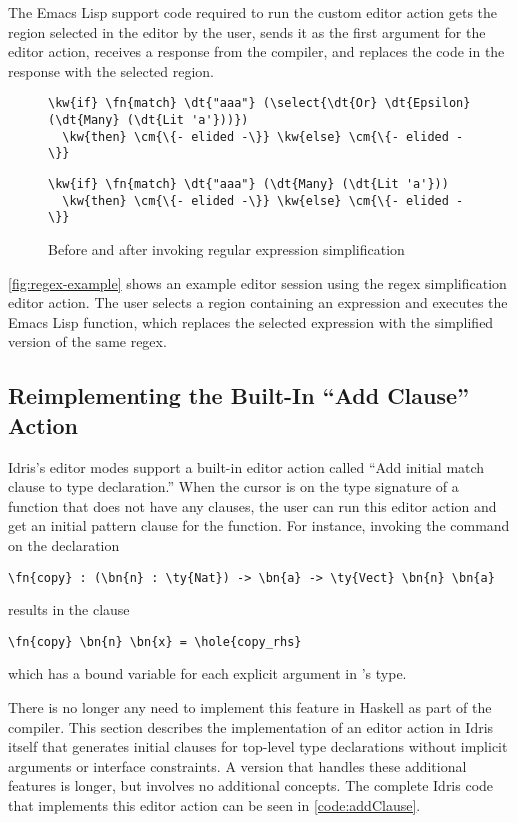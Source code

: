 The Emacs Lisp support code required to run the custom editor action gets the
region selected in the editor by the user, sends it as the first argument for
the  editor action, receives a response from the compiler,
and replaces the code in the response with the selected region.


\begin{figure}[ht]
\begin{Verbatim}
\kw{if} \fn{match} \dt{"aaa"} (\select{\dt{Or} \dt{Epsilon} (\dt{Many} (\dt{Lit 'a'}))})
  \kw{then} \cm{\{- elided -\}} \kw{else} \cm{\{- elided -\}}
\end{Verbatim}
  \vspace{1em}
\begin{Verbatim}
\kw{if} \fn{match} \dt{"aaa"} (\dt{Many} (\dt{Lit 'a'}))
  \kw{then} \cm{\{- elided -\}} \kw{else} \cm{\{- elided -\}}
\end{Verbatim}
\caption{Before and after invoking regular expression simplification}
  \label{fig:regex-example}
\end{figure}

\autoref{fig:regex-example} shows an example editor session using the regex
simplification editor action. The user selects a region containing an
expression and executes the Emacs Lisp function, which replaces the selected
expression with the simplified version of the same regex.

\subsection{Reimplementing the Built-In ``Add Clause'' Action}\label{sec:addClause}

Idris's editor modes support a built-in editor action called ``Add initial match
clause to type declaration.'' When the cursor is on the type signature of a
function that does not have any clauses, the user can run this editor action
and get an initial pattern clause for the function.
For instance, invoking the command on the declaration
\begin{Verbatim}
\fn{copy} : (\bn{n} : \ty{Nat}) -> \bn{a} -> \ty{Vect} \bn{n} \bn{a}
\end{Verbatim}
results in the clause
\begin{Verbatim}
\fn{copy} \bn{n} \bn{x} = \hole{copy_rhs}
\end{Verbatim}
which has a bound variable for each explicit argument in 's type.

There is no longer any need to implement this feature in Haskell as
part of the compiler. This section describes the implementation of an
editor action in Idris itself that generates initial clauses for top-level
type declarations without implicit arguments or interface
constraints. A version that handles these additional features is
longer, but involves no additional concepts. The complete Idris code that
implements this editor action can be seen in \autoref{code:addClause}.

